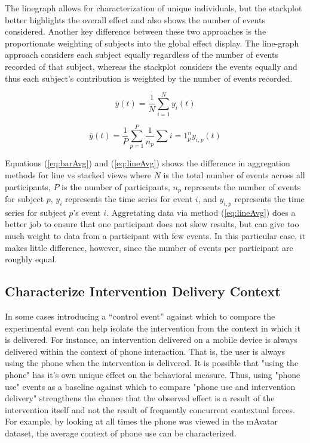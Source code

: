 The linegraph allows for characterization of unique individuals, but the stackplot better highlights the overall effect and also shows the number of events considered.
Another key difference between these two approaches is the proportionate weighting of subjects into the global effect display.
The line-graph approach considers each subject equally regardless of the number of events recorded of that subject, whereas the stackplot considers the events equally and thus each subject's contribution is weighted by the number of events recorded.

\begin{equation}
	\bar{y}(t) = \frac{1}{N} \sum\limits_{i=1}^N y_i(t)
	\label{eq:barAvg}
\end{equation}

\begin{equation}
	\bar{y}(t) = \frac{1}{P} \sum\limits_{p=1}^P \frac{1}{n_p} \sum\limits{i=1}^n_p y_{i,p}(t)
	\label{eq:lineAvg}
\end{equation}

Equations (\ref{eq:barAvg}) and (\ref{eq:lineAvg}) shows the difference in aggregation methods for line vs stacked views where $N$ is the total number of events across all participants, $P$ is the number of participants, $n_p$ represents the number of events for subject $p$,  $y_i$ represents the time series for event $i$, and $y_{i,p}$ represents the time series for subject $p$'s event $i$.
Aggretating data via method (\ref{eq:lineAvg}) does a better job to ensure that one participant does not skew results, but can give too much weight to data from a participant with few events.
In this particular case, it makes little difference, however, since the number of events per participant are roughly equal.

\subsection{Characterize Intervention Delivery Context}
In some cases introducing a “control event” against which to compare the experimental event can help isolate the intervention from the context in which it is delivered.
For instance, an intervention delivered on a mobile device is always delivered within the context of phone interaction.
That is, the user is always using the phone when the intervention is delivered.
It is possible that "using the phone" has it's own unique effect on the behavioral measure.
Thus, using "phone use" events as a baseline against which to compare "phone use and intervention delivery" strengthens the chance that the observed effect is a result of the intervention itself and not the result of frequently concurrent contextual forces.
For example, by looking at all times the phone was viewed in the mAvatar dataset, the average context of phone use can be characterized.

